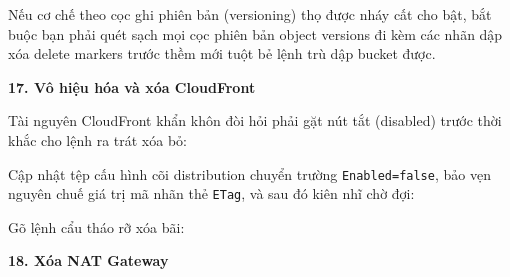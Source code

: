 Nếu cơ chế theo cọc ghi phiên bản (versioning) thọ được nháy cất cho
bật, bắt buộc bạn phải quét sạch mọi cọc phiên bản object versions đi
kèm các nhãn dập xóa delete markers trước thềm mới tuột bẻ lệnh trù dập
bucket được.

\vspace{0.5em}\noindent\textbf{17. Vô hiệu hóa và xóa
CloudFront}\par

Tài nguyên CloudFront khẩn khôn đòi hỏi phải gặt nút tắt (disabled)
trước thời khắc cho lệnh ra trát xóa bỏ:

\begin{Shaded}
\begin{Highlighting}[]
\end{Highlighting}
\end{Shaded}

Cập nhật tệp cấu hình cõi distribution chuyển trường
\texttt{Enabled=false}, bảo vẹn nguyên chuế giá trị mã nhãn thẻ
\texttt{ETag}, và sau đó kiên nhĩ chờ đợi:

\begin{Shaded}
\begin{Highlighting}[]
\end{Highlighting}
\end{Shaded}

Gõ lệnh cẩu tháo rỡ xóa bãi:

\begin{Shaded}
\begin{Highlighting}[]
\DataTypeTok{\textbackslash{}}
  \DataTypeTok{\textbackslash{}}
   \OperatorTok{\textless{}}\OperatorTok{\textgreater{}}
\end{Highlighting}
\end{Shaded}

\vspace{0.5em}\noindent\textbf{18. Xóa NAT Gateway}\par

\begin{Shaded}
\begin{Highlighting}[]
 \OperatorTok{\textless{}}\OperatorTok{\textgreater{}}
\end{Highlighting}
\end{Shaded}

